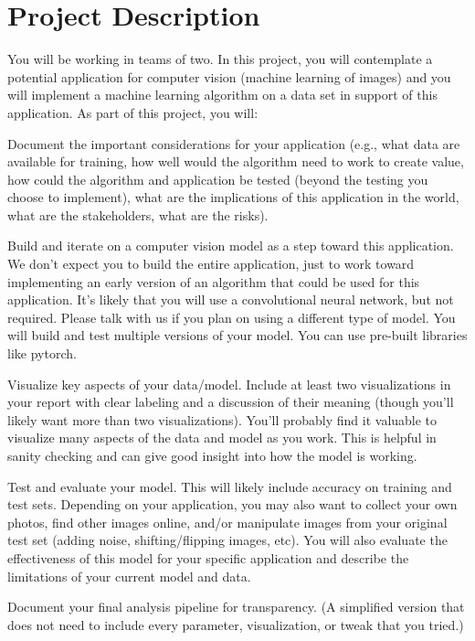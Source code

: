 \documentclass{tufte-handout}
\begin{document}
\section{Project Description}
You will be working in teams of two. In this project, you will contemplate a potential application for computer vision (machine learning of images) and you will implement a machine learning algorithm on a data set in support of this application. As part of this project, you will:
\bi[leftmargin=.5in]
\item Document the important considerations for your application (e.g., what data are available for training, how well would the algorithm need to work to create value, how could the algorithm and application be tested (beyond the testing you choose to implement), what are the implications of this application in the world, what are the stakeholders, what are the risks). 
\item Build and iterate on a computer vision model as a step toward this application. We don’t expect you to build the entire application, just to work toward implementing an early version of an algorithm that could be used for this application. It’s likely that you will use a convolutional neural network, but not required. Please talk with us if you plan on using a different type of model. You will build and test multiple versions of your model. You can use pre-built libraries like pytorch.
\item Visualize key aspects of your data/model. Include at least two visualizations in your report with clear labeling and a discussion of their meaning (though you'll likely want more than two visualizations). You’ll probably find it valuable to visualize many aspects of the data and model as you work. This is helpful in sanity checking and can give good insight into how the model is working.
\item Test and evaluate your model. This will likely include accuracy on training and test sets. Depending on your application, you may also want to collect your own photos, find other images online, and/or manipulate images from your original test set (adding noise, shifting/flipping images, etc). You will also evaluate the effectiveness of this model for your specific application and describe the limitations of your current model and data.
\item Document your final analysis pipeline for transparency. (A simplified version that does not need to include every parameter, visualization, or tweak that you tried.)
\ei
\end{document}
